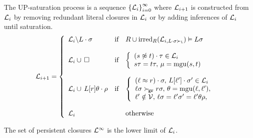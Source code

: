    \begin{definition}[UP-Saturation]

            The UP-{saturation process}
            is a sequence \( {\{ \mathcal{L}_i \}}_{i=0}^\infty \)
            where \( \mathcal{L}_{i+1} \) is constructed from \( \mathcal{L}_i \)
            by removing redundant literal closures in \( \mathcal{L}_i \)
            or by adding inferences of \( \mathcal{L}_i \) until saturation.
           \begin{gather*}
           \mathcal{L}_{i+1} = \left \{
                   \begin{array}{lclc}
                       \mathcal{L}_i \backslash L\cdot\sigma
                        &\text{if}
                        &R \cup \operatorname{irred}_R(\mathcal{L}_{i,L\cdot\sigma\mathrel\succ_{\mathtt{L}}}) \vDash L\sigma
                       \\
                       \\
                       \mathcal{L}_i \cup \, \square
                        &\text{if}
                        &\left \{ \begin{array}{l}
                            (s\not\approx t)\cdot\tau\in\mathcal{L}_i
                           \\
                            s\tau = t\tau,\,
                           \mu=\operatorname{mgu}(s,t)
                       \end{array}\right.
                       \\
                       \\
                       \mathcal{L}_i \cup{} \, L[r]\theta\cdot\rho{}
                        &\text{if}
                        &\left \{ \begin{array}{l}
                            (\ell\approx r)\cdot\sigma,\,
                            L[\ell']\cdot\sigma'\in\mathcal{L}_i
                           \\
                           \ell\sigma\mathrel\succ_{\!\mathtt{gr}} r\sigma,\,
                           \theta=\operatorname{mgu}(\ell,\ell'),
                           \\
                           \ell'\notin\mathcal{V},\,
                           \ell\sigma = \ell'\sigma' = \ell'\theta\rho,
                       \end{array}\right.
                       \\
                       \\
                       \mathcal{L}_i
                        &&\text{otherwise}
                   \end{array}
               \right.
               \end{gather*}

            The set of persistent closures \( \mathcal{L}^\infty \) is the lower limit of \( \mathcal{L}_i \).

   \end{definition}
